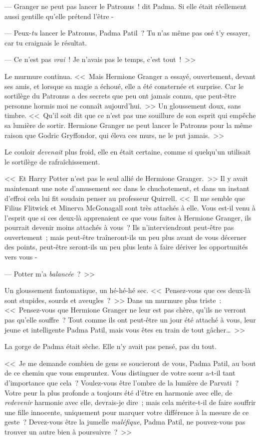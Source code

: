 --- Granger ne peut pas lancer le Patronus~! dit Padma. Si elle était réellement aussi gentille qu'elle prétend l'être -

--- Peux-\emph{tu} lancer le Patronus, Padma Patil~? Tu n'as même pas osé t'y essayer, car tu craignais le résultat.

--- Ce n'est pas \emph{vrai}~! Je n'avais pas le temps, c'est tout~!~>>

Le murmure continua. <<~Mais Hermione Granger a essayé, ouvertement, devant ses amis, et lorsque sa magie a échoué, elle a été consternée et surprise. Car le sortilège du Patronus a des secrets que peu ont jamais connu, que peut-être personne hormis moi ne connaît aujourd'hui.~>> Un gloussement doux, sans timbre. <<~Qu'il soit dit que ce n'est pas une souillure de son esprit qui empêche sa lumière de sortir. Hermione Granger ne peut lancer le Patronus pour la même raison que Godric Gryffondor, qui éleva ces murs, ne le put jamais.~>>

Le couloir \emph{devenait} plus froid, elle en était certaine, comme si quelqu'un utilisait le sortilège de rafraîchissement.

<<~Et Harry Potter n'est pas le seul allié de Hermione Granger.~>> Il y avait maintenant une note d'amusement sec dans le chuchotement, et dans un instant d'effroi cela lui fit soudain penser au professeur Quirrell. <<~Il me semble que Filius Flitwick et Minerva McGonagall sont très attachés à elle. Vous est-il venu à l'esprit que si ces deux-là apprenaient ce que vous faites à Hermione Granger, ils pourrait devenir moins attachés à vous~? Ils n'interviendront peut-être pas ouvertement~; mais peut-être traîneront-ils un peu plus avant de vous décerner des points, peut-être seront-ils un peu plus lents à faire dériver les opportunités vers vous -

--- Potter m'a \emph{balancée}~?~>>

Un gloussement fantomatique, un hé-hé-hé sec. <<~Pensez-vous que ces deux-là sont stupides, sourds et aveugles~?~>> Dans un murmure plus triste~: <<~Pensez-vous que Hermione Granger ne leur est pas chère, qu'ils ne verront pas qu'elle souffre~? Tout comme ils ont peut-être un jour été attaché à vous, leur jeune et intelligente Padma Patil, mais vous êtes en train de tout gâcher…~>>

La gorge de Padma était sèche. Elle n'y avait pas pensé, pas du tout.

<<~Je me demande combien de gens se soucieront de vous, Padma Patil, au bout de ce chemin que vous empruntez. Vous distinguer de votre sœur a-t-il tant d'importance que cela~? Voulez-vous être l'ombre de la lumière de Parvati~? Votre peur la plus profonde a toujours été d'être en harmonie avec elle, de \emph{redevenir} harmonie avec elle, devrais-je dire~; mais cela mérite-t-il de faire souffrir une fille innocente, uniquement pour marquer votre différence à la mesure de ce geste~? Devez-vous être la jumelle \emph{maléfique}, Padma Patil, ne pouvez-vous pas trouver un autre bien à poursuivre~?~>>

